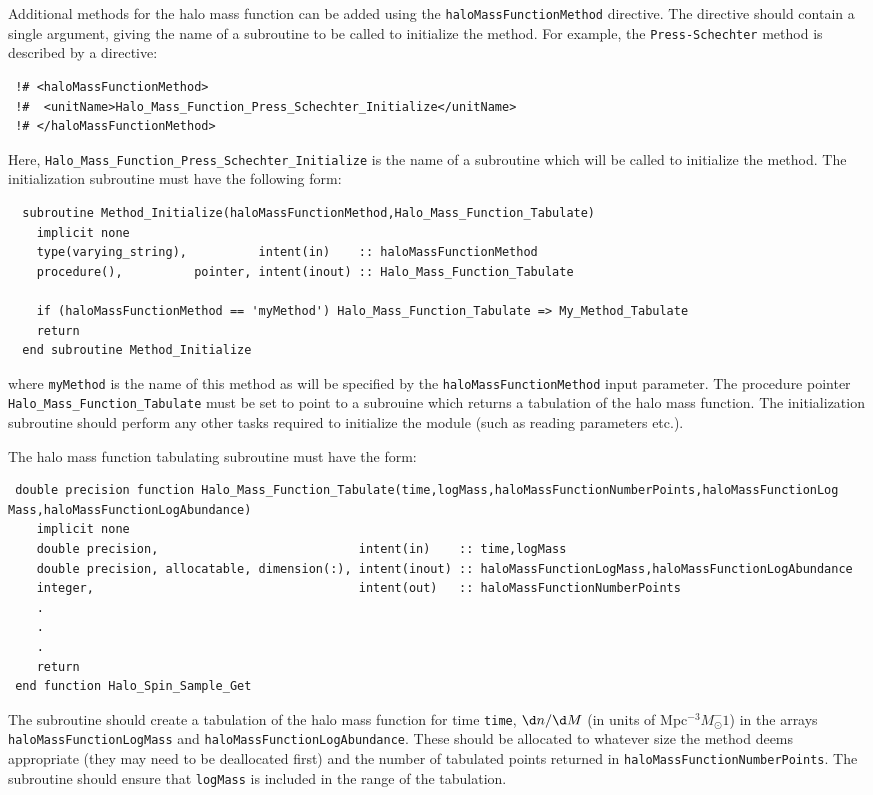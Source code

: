 Additional methods for the halo mass function can be added using the {\tt haloMassFunctionMethod} directive. The directive should contain a single argument, giving the name of a subroutine to be called to initialize the method. For example, the {\tt Press-Schechter} method is described by a directive:
\begin{verbatim}
 !# <haloMassFunctionMethod>
 !#  <unitName>Halo_Mass_Function_Press_Schechter_Initialize</unitName>
 !# </haloMassFunctionMethod>
\end{verbatim}
Here, {\tt Halo\_Mass\_Function\_Press\_Schechter\_Initialize} is the name of a subroutine which will be called to initialize the method. The initialization subroutine must have the following form:
\begin{verbatim}
  subroutine Method_Initialize(haloMassFunctionMethod,Halo_Mass_Function_Tabulate)
    implicit none
    type(varying_string),          intent(in)    :: haloMassFunctionMethod
    procedure(),          pointer, intent(inout) :: Halo_Mass_Function_Tabulate
    
    if (haloMassFunctionMethod == 'myMethod') Halo_Mass_Function_Tabulate => My_Method_Tabulate
    return
  end subroutine Method_Initialize
\end{verbatim}
where {\tt myMethod} is the name of this method as will be specified by the {\tt haloMassFunctionMethod} input parameter. The procedure pointer {\tt Halo\_Mass\_Function\_Tabulate} must be set to point to a subrouine which returns a tabulation of the halo mass function. The initialization subroutine should perform any other tasks required to initialize the module (such as reading parameters etc.).

The halo mass function tabulating subroutine must have the form:
\begin{verbatim}
 double precision function Halo_Mass_Function_Tabulate(time,logMass,haloMassFunctionNumberPoints,haloMassFunctionLog
Mass,haloMassFunctionLogAbundance)
    implicit none
    double precision,                            intent(in)    :: time,logMass
    double precision, allocatable, dimension(:), intent(inout) :: haloMassFunctionLogMass,haloMassFunctionLogAbundance
    integer,                                     intent(out)   :: haloMassFunctionNumberPoints
    .
    .
    .
    return
 end function Halo_Spin_Sample_Get
\end{verbatim}
The subroutine should create a tabulation of the halo mass function for time {\tt time}, $\d n/\d M$ (in units of Mpc$^{-3} M_\odot^-1$) in the arrays {\tt haloMassFunctionLogMass} and {\tt haloMassFunctionLogAbundance}. These should be allocated to whatever size the method deems appropriate (they may need to be deallocated first) and the number of tabulated points returned in {\tt haloMassFunctionNumberPoints}. The subroutine should ensure that {\tt logMass} is included in the range of the tabulation.

